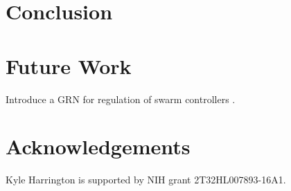 \section{Conclusion}

\section{Future Work}

Introduce a GRN for regulation of swarm controllers \cite{Gold2014}.

\section{Acknowledgements}

Kyle Harrington is supported by NIH grant 2T32HL007893-16A1.
